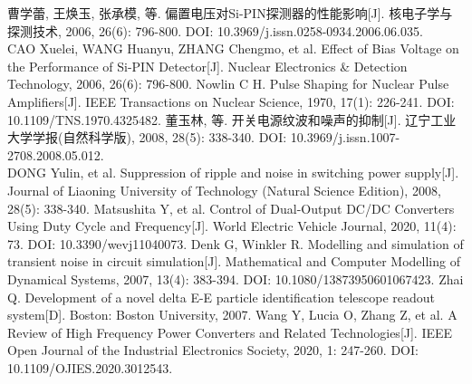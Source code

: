 \documentclass{ctexart}
\begin{document}
\begin{thebibliography}{99}
     曹学蕾, 王焕玉, 张承模, 等. 偏置电压对Si-PIN探测器的性能影响[J]. 核电子学与探测技术, 2006, 26(6): 796-800. DOI: 10.3969/j.issn.0258-0934.2006.06.035. \\
    CAO Xuelei, WANG Huanyu, ZHANG Chengmo, et al. Effect of Bias Voltage on the Performance of Si-PIN Detector[J]. Nuclear Electronics \& Detection Technology, 2006, 26(6): 796-800.
     Nowlin C H. Pulse Shaping for Nuclear Pulse Amplifiers[J]. IEEE Transactions on Nuclear Science, 1970, 17(1): 226-241. DOI: 10.1109/TNS.1970.4325482.
     董玉林, 等. 开关电源纹波和噪声的抑制[J]. 辽宁工业大学学报(自然科学版), 2008, 28(5): 338-340. DOI: 10.3969/j.issn.1007-2708.2008.05.012. \\
    DONG Yulin, et al. Suppression of ripple and noise in switching power supply[J]. Journal of Liaoning University of Technology (Natural Science Edition), 2008, 28(5): 338-340.
     Matsushita Y, et al. Control of Dual-Output DC/DC Converters Using Duty Cycle and Frequency[J]. World Electric Vehicle Journal, 2020, 11(4): 73. DOI: 10.3390/wevj11040073.
     Denk G, Winkler R. Modelling and simulation of transient noise in circuit simulation[J]. Mathematical and Computer Modelling of Dynamical Systems, 2007, 13(4): 383-394. DOI: 10.1080/13873950601067423.
     Zhai Q. Development of a novel delta E-E particle identification telescope readout system[D]. Boston: Boston University, 2007.
     Wang Y, Lucia O, Zhang Z, et al. A Review of High Frequency Power Converters and Related Technologies[J]. IEEE Open Journal of the Industrial Electronics Society, 2020, 1: 247-260. DOI: 10.1109/OJIES.2020.3012543.
\end{thebibliography}
\end{document}
